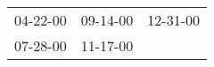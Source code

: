 \begin{supertabular}{p{0.33\columnwidth}p{0.33\columnwidth}p{0.33\columnwidth}}
 04-22-00\textsuperscript{} &  09-14-00\textsuperscript{} &  12-31-00\textsuperscript{} \\
 07-28-00\textsuperscript{} &  11-17-00\textsuperscript{} &                             \\
\end{supertabular}
